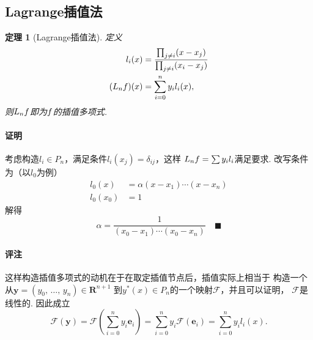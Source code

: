 \documentclass[12pt, a4paper]{article}
\theoremstyle{margin}
\newtheorem{thm}{定理}
\newcommand{\ms}{\mathscr}
\newcommand{\mbf}{\mathbf}
\newcommand{\f}{\mathnormal{f}}
\newcommand{\R}{\mathbf{R}}
\newcommand{\vep}{\varepsilon}
\newcommand{\remark}{\paragraph{评注}}
\newcommand{\proof}{\paragraph{证明}}
\begin{document}

\subsection{Lagrange插值法}
  \begin{thm}[Lagrange插值法]
    \label{thm: Lagrange插值法}
    定义
    \[\begin{split}
      l_i(x) &= \frac{\prod_{j\ne i}(x - x_j)}{\prod_{j\ne i}(x_i - x_j)} \\
      (L_n\f)(x) &= \sum_{i=0}^ny_il_i(x),
    \end{split}\]
    则$L_n\f$即为$\f$的插值多项式.
  \end{thm}
  \proof
    考虑构造$l_i\in P_n$，满足条件$l_i(x_j) = \delta_{ij}$，这样
    $L_n\f=\sum y_il_i$满足要求. 改写条件为（以$l_0$为例）
    \[\begin{split}
      l_0(x) &= \alpha(x-x_1)\cdots(x-x_n) \\
      l_0(x_0) &= 1
    \end{split}\]
    解得
    \[
      \alpha = \frac{1}{(x_0-x_1)\cdots(x_0-x_n)}\quad\blacksquare
    \]
  \remark
    这样构造插值多项式的动机在于在取定插值节点后，插值实际上相当于
    构造一个从$\mbf{y}=(y_0,\,\dots,\,y_n)\in\R^{n+1}$
    到$y^*(x)\in P_n$的一个映射$\ms{F}$，并且可以证明，
    $\ms{F}$是线性的. 因此成立
    \[
      \ms{F}(\mbf{y}) = \ms{F}(\sum_{i=0}^ny_i\mbf{e}_i)
       = \sum_{i=0}^ny_i\ms{F}(\mbf{e}_i)
       = \sum_{i=0}^ny_i l_i(x).
    \]
\end{document}

